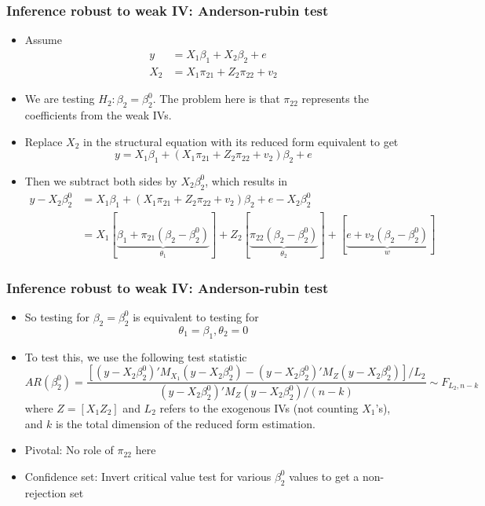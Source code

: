 \documentclass[aspectratio=169]{beamer}
\begin{document}
\begin{frame}
\frametitle{Inference robust to weak IV: Anderson-rubin test}
\begin{itemize}
\item Assume
\[
\begin{aligned}
y &=X_1\beta_1+ X_2\beta_2+e\\
X_2&=X_1\pi_{21}+Z_2\pi_{22} + v_2
\end{aligned}
\]
\item We are testing $H_2: \beta_2=\beta_2^0$. The problem here is that $\pi_{22}$ represents the coefficients from the weak IVs.
\item Replace $X_2$ in the structural equation with its reduced form equivalent to get
\[
y = X_1\beta_1+ (X_1\pi_{21}+Z_2\pi_{22} + v_2)\beta_2+e
\]
\item Then we subtract both sides by $X_2\beta_2^0$, which results in
\[
\begin{aligned}
y-X_2\beta_2^0 &=X_1\beta_1+ (X_1\pi_{21}+Z_2\pi_{22} + v_2)\beta_2+e - X_2\beta_2^0\\
&=X_1[\underbrace{\beta_1 +\pi_{21}(\beta_2-\beta_2^0)}_{\theta_1}] + Z_2[\underbrace{\pi_{22}(\beta_2-\beta_2^0)}_{\theta_2}]+[\underbrace{e+v_2(\beta_2-\beta_2^0)}_{w}]
\end{aligned}
\]
\end{itemize}
\end{frame}

\begin{frame}
\frametitle{Inference robust to weak IV: Anderson-rubin test}
\begin{itemize}
\item So testing for $\beta_2=\beta_2^0$ is equivalent to testing for
\[
\theta_1= \beta_1, \theta_2 = 0
\]
\item To test this, we use the following test statistic
\[
AR(\beta_2^0)=\frac{[(y-X_2\beta_2^0)'M_{X_1}(y-X_2\beta_2^0)-(y-X_2\beta_2^0)'M_{Z}(y-X_2\beta_2^0)]/L_2}{(y-X_2\beta_2^0)'M_{Z}(y-X_2\beta_2^0)/ (n-k)} \sim F_{L_2, n-k}
\]
where $Z=[X_1 Z_2]$ and $L_2$ refers to the exogenous IVs (not counting $X_1$'s), and $k$ is the total dimension of the reduced form estimation.
\item Pivotal: No role of $\pi_{22}$ here
\item Confidence set: Invert critical value test for various $\beta_2^0$ values to get a non-rejection set
\end{itemize}
\end{frame}
\end{document}
